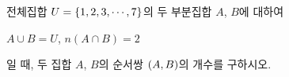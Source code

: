 전체집합 $U=\{1{,}\mkern3mu\mathopen{}2{,}\mkern3mu\mathopen{}3{,}\mkern3mu\mathopen{}\cdots{,}\mkern3mu\mathopen{}7\}$의 두 부분집합 $A$, $B$에 대하여\par\smallskip\noindent\hspace*{1.5em}$A\cup B=U$, $n(A\cap B)=2$\par\smallskip\noindent 일 때, 두 집합 $A$, $B$의 순서쌍 $(A{,}\mkern3mu\mathopen{}B)$의 개수를 구하시오.
